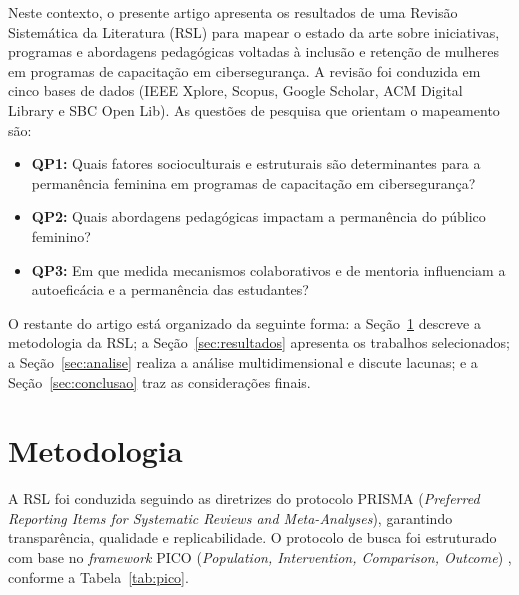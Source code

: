 \documentclass[12pt]{article}
\begin{document}
Neste contexto, o presente artigo apresenta os resultados de uma Revisão Sistemática da Literatura (RSL) para mapear o estado da arte sobre iniciativas, programas e abordagens pedagógicas voltadas à inclusão e retenção de mulheres em programas de capacitação em cibersegurança. A revisão foi conduzida em cinco bases de dados (IEEE Xplore, Scopus, Google Scholar, ACM Digital Library e SBC Open Lib). As questões de pesquisa que orientam o mapeamento são:

\begin{itemize}
  \item \textbf{QP1:} Quais fatores socioculturais e estruturais são determinantes para a permanência feminina em programas de capacitação em cibersegurança?
  \item \textbf{QP2:} Quais abordagens pedagógicas impactam a permanência do público feminino?
  \item \textbf{QP3:} Em que medida mecanismos colaborativos e de mentoria influenciam a autoeficácia e a permanência das estudantes?
\end{itemize}

O restante do artigo está organizado da seguinte forma: a Seção~\ref{sec:metodo} descreve a metodologia da RSL; a Seção~\ref{sec:resultados} apresenta os trabalhos selecionados; a Seção~\ref{sec:analise} realiza a análise multidimensional e discute lacunas; e a Seção~\ref{sec:conclusao} traz as considerações finais.


\section{Metodologia} \label{sec:metodo}

A RSL foi conduzida seguindo as diretrizes do protocolo PRISMA (\textit{Preferred Reporting Items for Systematic Reviews and Meta-Analyses}), garantindo transparência, qualidade e replicabilidade. O protocolo de busca foi estruturado com base no \textit{framework} PICO (\textit{Population, Intervention, Comparison, Outcome}) \cite{Schardt2007}, conforme a Tabela~\ref{tab:pico}.
\end{document}
